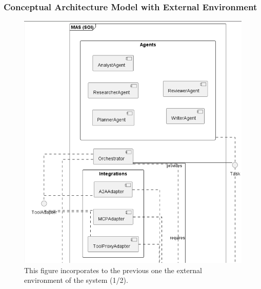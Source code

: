 \subsubsection*{Conceptual Architecture Model with External Environment}
\begin{figure}[htbp]
  \centering
  \includegraphics[width=0.9\linewidth]{ressources/MAS/diagrams/MAS_arch_and_environment1.png}
  \caption{This figure incorporates to the previous one the external environment of the system (1/2).}
  \label{fig:app-mas-arch-mod}
\end{figure}

